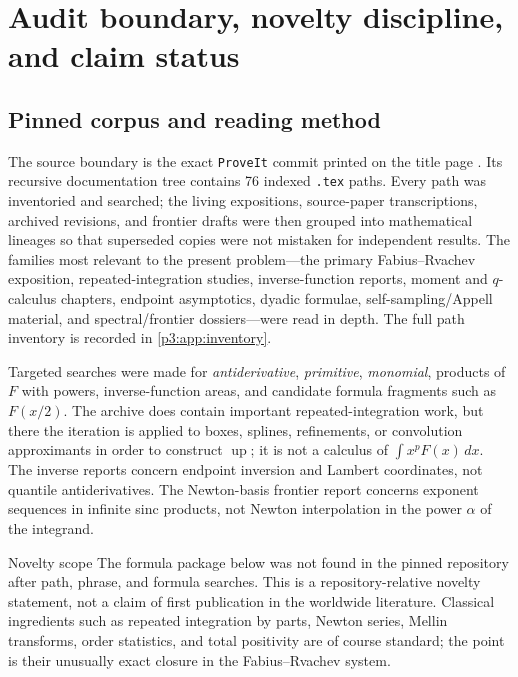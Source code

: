 \documentclass[11pt,oneside]{article}
\theoremstyle{definition}
\theoremstyle{remark}
\newcommand{\Up}{\operatorname{up}}
\newcommand{\1}{\mathbf 1}
\begin{document}
\clearpage

\section{Audit boundary, novelty discipline, and claim status}
\label{p3:sec:audit}

\subsection{Pinned corpus and reading method}

The source boundary is the exact \texttt{ProveIt} commit printed on the title page \cite{p3:proveit}.  Its recursive documentation
tree contains 76 indexed \texttt{.tex} paths.  Every path was inventoried and searched; the
living expositions, source-paper transcriptions, archived revisions, and frontier drafts were
then grouped into mathematical lineages so that superseded copies were not mistaken for
independent results.  The families most relevant to the present problem---the primary
Fabius--Rvachev exposition, repeated-integration studies, inverse-function reports, moment and
$q$-calculus chapters, endpoint asymptotics, dyadic formulae, self-sampling/Appell material,
and spectral/frontier dossiers---were read in depth.  The full path inventory is recorded in
\cref{p3:app:inventory}.

Targeted searches were made for \emph{antiderivative}, \emph{primitive}, \emph{monomial},
products of $F$ with powers, inverse-function areas, and candidate formula fragments such as
$F(x/2)$.  The archive does contain important repeated-integration work, but there the
iteration is applied to boxes, splines, refinements, or convolution approximants in order to
construct $\Up$; it is not a calculus of $\int x^pF(x)\,dx$.  The inverse reports concern
endpoint inversion and Lambert coordinates, not quantile antiderivatives.  The Newton-basis
frontier report concerns exponent sequences in infinite sinc products, not Newton interpolation
in the power $\alpha$ of the integrand.

\begin{warningbox}{Novelty scope}
The formula package below was not found in the pinned repository after path, phrase, and
formula searches.  This is a repository-relative novelty statement, not a claim of first
publication in the worldwide literature.  Classical ingredients such as repeated integration
by parts, Newton series, Mellin transforms, order statistics, and total positivity are of
course standard; the point is their unusually exact closure in the Fabius--Rvachev system.
\end{warningbox}
\end{document}
